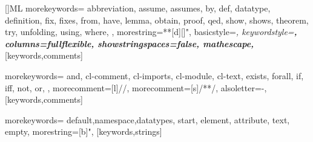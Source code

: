 \RequirePackage{listings}
% 
% 
% 
% 

[]{ML}%
{morekeywords={%
abbreviation,%
assume,%
assumes,%
by,%
def,%
datatype,%
definition,%
fix,%
fixes,%
from,%
have,%
lemma,%
obtain,%
proof,%
qed,%
show,%
shows,%
theorem,%
try,%
unfolding,%
using,%
where,%
},
morestring=**[d][\color{IsabelleStringBackground}]{"},
basicstyle=\itshape,%
keywordstyle=\upshape\bfseries,%
columns=fullflexible,%
showstringspaces=false,%
mathescape,%
}[keywords,comments]


%
{morekeywords={%
and,%
cl-comment,%
cl-imports,%
cl-module,%
cl-text,%
exists,%
forall,%
if,%
iff,%
not,%
or,%
},
morecomment=[l]{//},%
morecomment=[s]{/*}{*/},%
alsoletter=-,%
}[keywords,comments]

%
{morekeywords={%
default,namespace,datatypes,%
start,%
element,%
attribute,%
text,%
empty},
morestring=[b]",%
}[keywords,strings]


